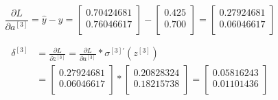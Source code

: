 \documentclass{article}
\begin{document}
\[
    \frac{\partial L}{\partial a^{[3]}}=\widehat{y}-y=\begin{bmatrix}
        0.70424681 \\
        0.76046617 \\
    \end{bmatrix}
    - \begin{bmatrix}
        0.425 \\
        0.700 \\
    \end{bmatrix}
    = \begin{bmatrix}
        0.27924681 \\
        0.06046617 \\
    \end{bmatrix}
\]

\[
    \begin{aligned}
        \delta^{[3]} & = \frac{\partial L}{\partial z^{[3]}} = \frac{\partial L}{\partial a^{[3]}}*\sigma^{[3]'}(z^{[3]}) \\
                     & = \begin{bmatrix}
                             0.27924681 \\
                             0.06046617 \\
                         \end{bmatrix}
        * \begin{bmatrix}
              0.20828324 \\
              0.18215738 \\
          \end{bmatrix}
        = \begin{bmatrix}
              0.05816243 \\
              0.01101436 \\
          \end{bmatrix}
    \end{aligned}
\]
\end{document}

